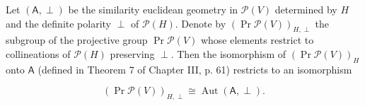 Let $(\mathsf{A}, \perp)$ be the similarity euclidean geometry in $\mathcal{P}(V)$ determined by $H$ and the definite polarity $\perp$ of $\mathcal{P}(H)$. Denote by $(\Pr \mathcal{P}(V))_{H,\perp}$ the subgroup of the projective group $\Pr \mathcal{P}(V)$ whose elements restrict to collineations of $\mathcal{P}(H)$ preserving $\perp$. Then the isomorphism of $(\Pr \mathcal{P}(V))_{H}$ onto $\mathsf{A}$ (defined in Theorem 7 of Chapter III, p. 61) restricts to an isomorphism

$$(\Pr \mathcal{P}(V))_{H,\perp} \cong \operatorname{Aut}(\mathsf{A}, \perp).$$
